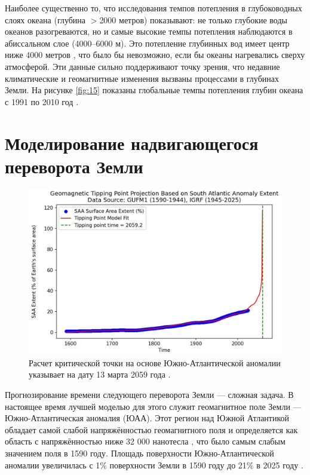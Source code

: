 \documentclass[10pt,twocolumn,letterpaper]{article}
\begin{document}
Наиболее существенно то, что исследования темпов потепления в глубоководных слоях океана (глубина $>$2000 метров) показывают: не только глубокие воды океанов разогреваются, но и самые высокие темпы потепления наблюдаются в абиссальном слое (4000–6000 м). Это потепление глубинных вод имеет центр ниже 4000 метров \cite{132,129}, что было бы невозможно, если бы океаны нагревались сверху атмосферой. Эти данные сильно поддерживают точку зрения, что недавние климатические и геомагнитные изменения вызваны процессами в глубинах Земли. На рисунке \ref{fig:15} показаны глобальные темпы потепления глубин океана с 1991 по 2010 год \cite{132}.

\section{Моделирование надвигающегося переворота Земли}

\begin{figure}[b]
\begin{center}
   \includegraphics[width=1\linewidth]{saa-crop.jpeg}
\end{center}
   \caption{Расчет критической точки на основе Южно-Атлантической аномалии указывает на дату 13 марта 2059 года \cite{125,126}.}
\label{fig:16}
\label{fig:onecol}
\end{figure}

Прогнозирование времени следующего переворота Земли — сложная задача. В настоящее время лучшей моделью для этого служит геомагнитное поле Земли — Южно-Атлантическая аномалия (ЮАА). Этот регион над Южной Атлантикой обладает самой слабой напряжённостью геомагнитного поля и определяется как область с напряжённостью ниже 32 000 нанотесла \cite{135}, что было самым слабым значением поля в 1590 году. Площадь поверхности Южно-Атлантической аномалии увеличилась с 1\% поверхности Земли в 1590 году до 21\% в 2025 году \cite{136}.
\end{document}
